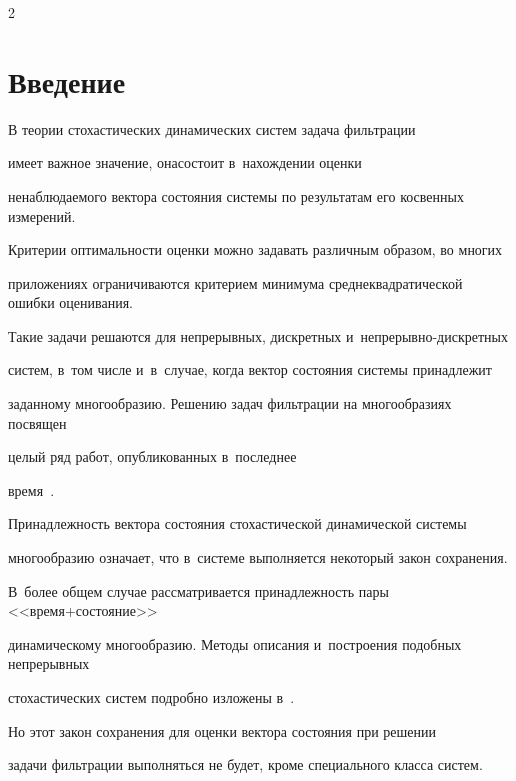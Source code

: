 \begin{multicols}{2}



\label{st\stat}



\section{Введение}



В теории стохастических динамических систем задача фильтрации 

имеет важное значение, она\linebreak состоит в~нахождении оценки 

ненаблюдаемого вектора состояния системы по результатам его косвенных измерений. 

Критерии оптимальности оценки можно задавать различным образом, во многих 

приложениях ограничиваются критерием минимума среднеквадратической ошибки оценивания. 

Такие задачи решаются для непрерывных, дискретных и~не\-пре\-рыв\-но-дис\-крет\-ных 

систем, в~том числе и~в~случае, когда вектор состояния системы принадлежит 

заданному многообразию. Решению задач фильтрации на многообразиях посвящен 

целый ряд работ, опубликованных в~последнее 

время~\cite{Sin_SSI16, Sin_IP16, SinSinKor_SSI16, SinSinKor_IP17, SinSinSerKor_AiT18}.



Принадлежность вектора состояния стохастической динамической системы 

многообразию означает, что в~системе выполняется некоторый закон сохранения. 

В~более общем случае рассматривается принадлежность пары <<вре\-мя\;+\;со\-сто\-яние>> 

динамическому многообразию. Методы описания и~построения подобных непрерывных 

стохастических систем подробно изложены в~\cite{Dub_89, Dub_12, Kar_14, Kar_15}. 

Но этот закон сохранения для оценки вектора состояния при решении 

задачи фильтрации выполняться не будет, кроме специального класса систем.




\end{multicols}
